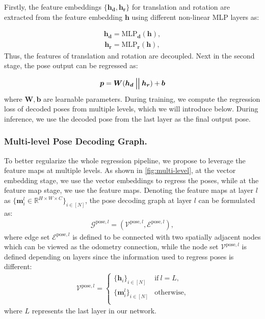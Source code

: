\documentclass[letterpaper]{article} \usepackage{aaai23}  \usepackage{times}  \usepackage{helvet}  \usepackage{courier}  \usepackage[hyphens]{url}  \usepackage{graphicx} \urlstyle{rm} \def\UrlFont{\rm}  \usepackage{natbib}  \usepackage{caption} \frenchspacing  \setlength{\pdfpagewidth}{8.5in} \setlength{\pdfpageheight}{11in} \usepackage{booktabs}
\theoremstyle{remark}
\theoremstyle{plain}
\newcommand{\mbb}{\bm{b}}
\newcommand{\mbd}{\bm{d}}
\newcommand{\mbh}{\bm{h}}
\newcommand{\mbm}{\bm{m}}
\newcommand{\mbp}{\bm{p}}
\newcommand{\mbr}{\bm{r}}
\newcommand{\mbW}{\bm{W}}
\DeclareMathOperator*{\concat}{\scalerel*{\parallel}{\sum}}
\begin{document}
Firstly, the feature embeddings $\{ \mbh_{\mbd},  \mbh_{\mbr}\}$ for translation and rotation are extracted from the feature embedding $\mbh$ using different non-linear MLP layers as:

\begin{align}
\mbh_{\mbd}=\mathrm{MLP}_{\mbd}(\mbh),
\end{align}
\begin{align}
\mbh_{\mbr}=\mathrm{MLP}_{\mbr}(\mbh),
\end{align}
Thus, the features of translation and rotation are decoupled. Next in the second stage, the pose output can be regressed as:

\begin{align}
\mbp=\mbW (\mbh_{\mbd}\concat\mbh_{\mbr}) + \mbb
\end{align}
where $\mbW,\mbb$ are learnable parameters. During training, we compute the regression loss of decoded poses from multiple levels, which we will introduce below. During inference, we use the decoded pose from the last layer as the final output pose.














\subsubsection{Multi-level Pose Decoding Graph.}  
To better regularize the whole regression pipeline, we propose to leverage the feature maps at multiple levels. As shown in \cref{fig:multi-level}, at the vector embedding stage, we use the vector embeddings to regress the poses, while at the feature map stage, we use the feature maps. Denoting the feature maps at layer $l$ as $\{ \mbm_{i}^{l} \in \mathbb{R}^{H \times W \times C} \}_{i\in[N]}$, the pose decoding graph at layer $l$ can be formulated as: 
\begin{align}
\mathcal{G}^{\mathrm{pose},l}=(\mathcal{V}^{\mathrm{pose},l},\mathcal{E}^{\mathrm{pose},l}),
\end{align}
where edge set $\mathcal{E}^{\mathrm{pose},l}$ is defined to be connected with two spatially adjacent nodes which can be viewed as the odometry connection, while the node set $\mathcal{V}^{\mathrm{pose},l}$ is defined depending on layers since the information used to regress poses is different:
\begin{align}
\mathcal{V}^{\mathrm{pose},l}=
\left\{
\begin{array}{ll}
\{ \mbh_{i} \}_{i\in[N]} & \text{if}\  l=L, \\
\{ \mbm_{i}^{l} \}_{i\in[N]} & \text{otherwise}, \\
\end{array}
\right.
\end{align}
where $L$ represents the last layer in our network.
\end{document}

